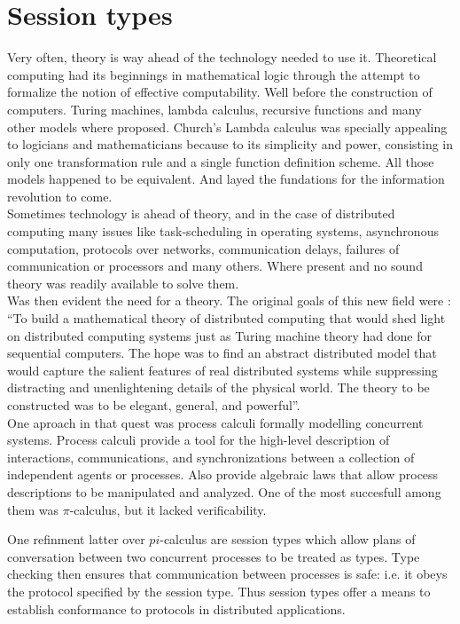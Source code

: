 \documentclass{tufte-book} %
\begin{document}
\newpage
\section{Session types}

Very often, theory is way ahead of the technology needed to use it. Theoretical computing had its beginnings in mathematical logic through the attempt to formalize the notion of effective computability. Well before the construction of computers. Turing machines, lambda calculus, recursive functions and many other models where proposed. Church's Lambda calculus was specially appealing to logicians and mathematicians because to its simplicity and power, consisting in only one transformation rule and a single function definition scheme. All those models happened to be equivalent. And layed the fundations for the information revolution to come.\\

Sometimes technology is ahead of theory, and in the case of distributed computing many issues like task-scheduling in operating systems, asynchronous computation, protocols over networks, communication delays, failures of communication or processors and many others. Where present and no sound theory was readily available to solve them.\\

Was then evident the need for a theory. The original goals of this new field were \cite{Fischer03}: ``To build a mathematical theory of distributed computing that would shed light on distributed computing systems just as Turing machine theory had done for sequential computers. The hope was to find an abstract distributed model that would capture the salient features of real distributed systems while suppressing distracting and unenlightening details of the physical world. The theory to be constructed was to be elegant, general, and powerful''.\\

One aproach in that quest was process calculi formally modelling concurrent systems. Process calculi provide a tool for the high-level description of interactions, communications, and synchronizations between a collection of independent agents or processes. Also provide algebraic laws that allow process descriptions to be manipulated and analyzed. One of the most succesfull among them was $\pi$-calculus, but it lacked verificability.

One refinment latter over $pi$-calculus are session types which allow plans of conversation between two concurrent processes to be treated as types. Type checking then ensures that
communication between processes is safe: i.e. it obeys the protocol specified by the session type. Thus session types offer a means to establish conformance to protocols in distributed applications.
\end{document}
